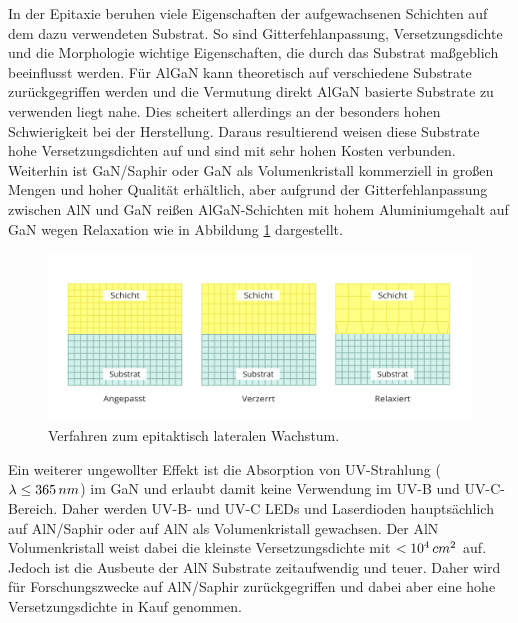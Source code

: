 In der Epitaxie beruhen viele Eigenschaften der aufgewachsenen Schichten auf dem dazu verwendeten Substrat. So sind Gitterfehlanpassung, Versetzungsdichte und die Morphologie wichtige Eigenschaften, die durch das Substrat maßgeblich beeinflusst werden. Für AlGaN kann theoretisch auf verschiedene Substrate zurückgegriffen werden und die Vermutung direkt AlGaN basierte Substrate zu verwenden liegt nahe. Dies scheitert allerdings an der besonders hohen Schwierigkeit bei der Herstellung.
\newline
Daraus resultierend weisen diese Substrate hohe Versetzungsdichten auf und sind mit sehr hohen Kosten verbunden. Weiterhin ist GaN/Saphir oder GaN als Volumenkristall kommerziell in großen Mengen und hoher Qualität erhältlich, aber aufgrund der Gitterfehlanpassung zwischen AlN und GaN reißen AlGaN-Schichten mit hohem Aluminiumgehalt auf GaN wegen Relaxation \cite{problem} wie in Abbildung \ref{fig:wachstum} dargestellt.
\begin{figure}[h]
    \centering
    \begin{minipage}[t]{1\linewidth}
    \centering
    \includegraphics[width=1\linewidth]{Bilder/wachstumsarten.png}
    \end{minipage}%
    \caption{Verfahren zum epitaktisch lateralen Wachstum.}
     \label{fig:wachstum}
\end{figure} 
Ein weiterer ungewollter Effekt ist die Absorption von UV-Strahlung ($\lambda \leq 365 \thinspace nm$) im GaN und erlaubt damit keine Verwendung im UV-B und UV-C-Bereich. Daher werden UV-B- und UV-C LEDs und Laserdioden hauptsächlich auf AlN/Saphir oder auf AlN als Volumenkristall gewachsen. Der AlN Volumenkristall weist dabei die kleinste Versetzungsdichte mit $<10^4 \thinspace cm^2$ auf. Jedoch ist die Ausbeute der AlN Substrate zeitaufwendig und teuer. Daher wird für Forschungszwecke auf AlN/Saphir zurückgegriffen und dabei aber eine hohe Versetzungsdichte in Kauf genommen. 
\newline
